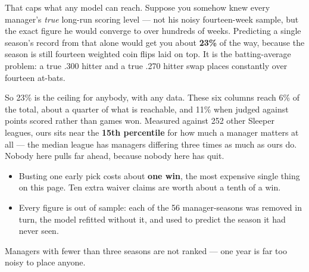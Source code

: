 \documentclass[10pt]{article}
\begin{document}
\vspace{6pt}
That caps what any model can reach. Suppose you somehow knew every manager's
\emph{true} long-run scoring level --- not his noisy fourteen-week sample, but the
exact figure he would converge to over hundreds of weeks. Predicting a single
season's record from that alone would get you about \textbf{23\%} of the way,
because the season is still fourteen weighted coin flips laid on top. It is the
batting-average problem: a true .300 hitter and a true .270 hitter swap places
constantly over fourteen at-bats.

\vspace{6pt}
So 23\% is the ceiling for anybody, with any data. These six columns reach 6\% of
the total, about a quarter of what is reachable, and 11\% when judged against
points scored rather than games won. Measured against 252 other Sleeper leagues,
ours sits near the \textbf{15th percentile} for how much a manager matters at
all --- the median league has managers differing three times as much as ours do.
Nobody here pulls far ahead, because nobody here has quit.

\vspace{6pt}
\begin{itemize}[leftmargin=1.4em,itemsep=2.5pt,topsep=0pt]
\item Busting one early pick costs about \textbf{one win}, the most expensive single
      thing on this page. Ten extra waiver claims are worth about a tenth of a win.
\item Every figure is out of sample: each of the 56 manager-seasons was removed
      in turn, the model refitted without it, and used to predict the season it
      had never seen.
\end{itemize}

\vspace{11pt}
{\color{muted}\small Managers with fewer than three seasons are not ranked --- one
year is far too noisy to place anyone.}
\end{document}
